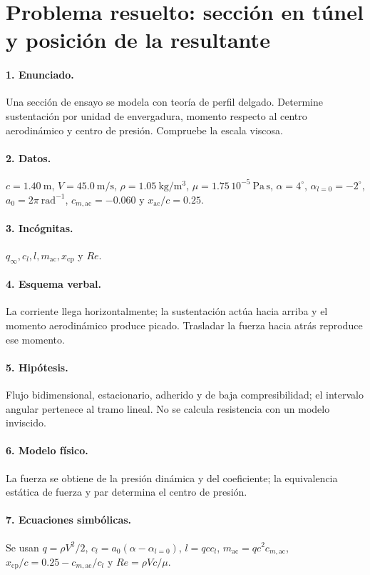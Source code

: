 \section{Problema resuelto: sección en túnel y posición de la resultante}
\paragraph{1. Enunciado.} Una sección de ensayo se modela con teoría de perfil delgado. Determine sustentación por unidad de envergadura, momento respecto al centro aerodinámico y centro de presión. Compruebe la escala viscosa.
\paragraph{2. Datos.} $c=1.40\ \mathrm m$, $V=45.0\ \mathrm{m/s}$, $\rho=1.05\ \mathrm{kg/m^3}$, $\mu=1.75\,10^{-5}\ \mathrm{Pa\,s}$, $\alpha=4^\circ$, $\alpha_{l=0}=-2^\circ$, $a_0=2\pi\ \mathrm{rad^{-1}}$, $c_{m,\mathrm{ac}}=-0.060$ y $x_{\mathrm{ac}}/c=0.25$.
\paragraph{3. Incógnitas.} $q_\infty,c_l,l,m_{\mathrm{ac}},x_{\mathrm{cp}}$ y $Re$.
\paragraph{4. Esquema verbal.} La corriente llega horizontalmente; la sustentación actúa hacia arriba y el momento aerodinámico produce picado. Trasladar la fuerza hacia atrás reproduce ese momento.
\paragraph{5. Hipótesis.} Flujo bidimensional, estacionario, adherido y de baja compresibilidad; el intervalo angular pertenece al tramo lineal. No se calcula resistencia con un modelo inviscido.
\paragraph{6. Modelo físico.} La fuerza se obtiene de la presión dinámica y del coeficiente; la equivalencia estática de fuerza y par determina el centro de presión.
\paragraph{7. Ecuaciones simbólicas.} Se usan $q=\rho V^2/2$, $c_l=a_0(\alpha-\alpha_{l=0})$, $l=qcc_l$, $m_{\mathrm{ac}}=qc^2c_{m,\mathrm{ac}}$, $x_{\mathrm{cp}}/c=0.25-c_{m,\mathrm{ac}}/c_l$ y $Re=\rho Vc/\mu$.
